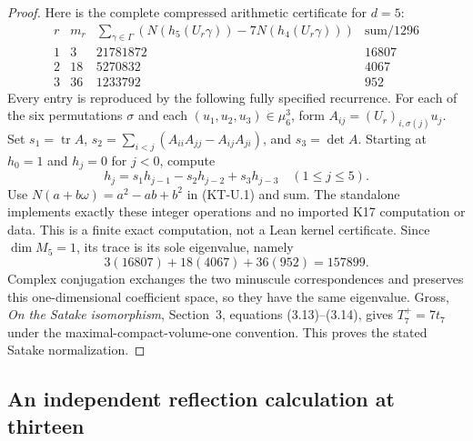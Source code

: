 \documentclass[11pt,a4paper]{article}
\theoremstyle{definition}
\begin{document}
\begin{proof}
Here is the complete compressed arithmetic certificate for $d=5$:
\[
\begin{array}{c|r|r|r}
r&m_r&\displaystyle\sum_{\gamma\in\Gamma}
       (N(h_5(U_r\gamma))-7N(h_4(U_r\gamma)))
       &\text{sum}/1296\\\hline
1&3&21781872&16807\\
2&18&5270832&4067\\
3&36&1233792&952
\end{array}
\]
Every entry is reproduced by the following fully specified recurrence.
For each of the six permutations $\sigma$ and each
$(u_1,u_2,u_3)\in\mu_6^3$, form $A_{ij}=(U_r)_{i,\sigma(j)}u_j$.
Set $s_1=\operatorname{tr}A$,
$s_2=\sum_{i<j}(A_{ii}A_{jj}-A_{ij}A_{ji})$, and $s_3=\det A$.
Starting at $h_0=1$ and $h_j=0$ for $j<0$, compute
\[
             h_j=s_1h_{j-1}-s_2h_{j-2}+s_3h_{j-3}
             \quad(1\leq j\leq5).
\]
Use $N(a+b\omega)=a^2-ab+b^2$ in (KT-U.1) and sum.
The standalone  implements exactly
these integer operations and no imported K17 computation or data.
This is a finite exact computation, not a Lean kernel certificate.
Since $\dim M_5=1$, its trace is its sole eigenvalue, namely
\[
           3(16807)+18(4067)+36(952)=157899.
\]
Complex conjugation exchanges the two minuscule correspondences
and preserves this one-dimensional coefficient space, so they have
the same eigenvalue. Gross, \emph{On the Satake isomorphism},
Section~3, equations (3.13)--(3.14), gives $T_7^+=7t_7$ under
the maximal-compact-volume-one convention. This proves the stated
Satake normalization.
\end{proof}

\subsection{An independent reflection calculation at thirteen}
\end{document}
